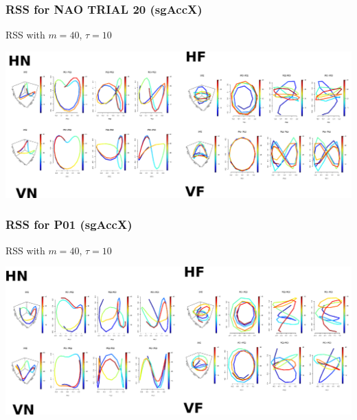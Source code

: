 \documentclass{beamer}
\begin{document}
\begin{frame}
\frametitle{RSS for NAO TRIAL 20 (sgAccX)}

RSS with $m=40$, $\tau=10$
\begin{adjustwidth}{-3em}{-3em}
\includegraphics[width=1.2\textwidth]{Robot_p20rss}
\end{adjustwidth}

\end{frame}




\begin{frame}
\frametitle{RSS for P01 (sgAccX)}

RSS with $m=40$, $\tau=10$
\begin{adjustwidth}{-3em}{-3em}
\includegraphics[width=1.2\textwidth]{Humans_p01rss}
\end{adjustwidth}

\end{frame}
\end{document}
